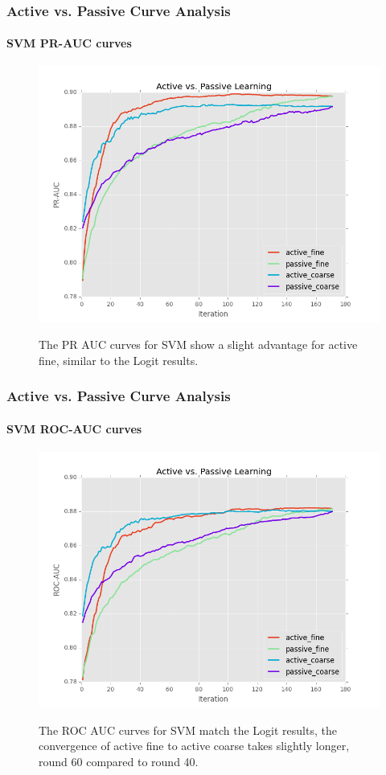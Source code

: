 \documentclass{beamer}
\begin{document}
\begin{frame}
    \frametitle{Active vs. Passive Curve Analysis}
    \framesubtitle{SVM PR-AUC curves}
    \begin{figure}[!htb]
        \centering
        \includegraphics[width=0.70\columnwidth]{fig/runActPassSVM_pr}
        \label{fig:ActiveVsPassivePRSVM}
        \caption{The PR AUC curves for SVM show a slight advantage for active fine,
         similar to the Logit results.}
    \end{figure}
\end{frame}
\begin{frame}
    \frametitle{Active vs. Passive Curve Analysis}
    \framesubtitle{SVM ROC-AUC curves}
    \begin{figure}[!htb]
        \centering
        \includegraphics[width=0.70\columnwidth]{fig/runActPassSVM_roc}
        \label{fig:ActiveVsPassiveROCSVM}
        \caption{The ROC AUC curves for SVM match the Logit results, the convergence of
         active fine to active coarse takes slightly longer, round 60 compared to round 40.}
    \end{figure}
\end{frame}
\end{document}
